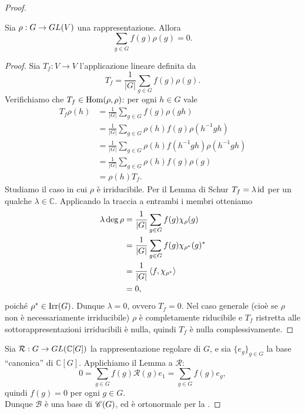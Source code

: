 \begin{proof}
\begin{lemma*}
Sia $\rho:G\to GL(V)$ una rappresentazione. Allora
$$
\sum_{g\in G}f(g)\rho(g)=0.
$$
\end{lemma*}
\begin{proof}
Sia $T_f:V\to V$ l'applicazione lineare definita da
$$
T_f=\frac{1}{|G|}\sum_{g\in G}f(g)\rho(g).
$$
Verifichiamo che $T_f\in\operatorname{Hom}(\rho,\rho)$: per ogni $h\in G$ vale
\begin{align*}
T_f\rho(h)&=\frac{1}{|G|}\sum_{g\in G}f(g)\rho(gh)\\
&=\frac{1}{|G|}\sum_{g\in G}\rho(h)f(g)\rho(h^{-1}gh)\\
&=\frac{1}{|G|}\sum_{g\in G}\rho(h)f(h^{-1}gh)\rho(h^{-1}gh)\\
&=\frac{1}{|G|}\sum_{g\in G}\rho(h)f(g)\rho(g)\\
&=\rho(h)T_f.
\end{align*}
Studiamo il caso in cui $\rho$ è irriducibile. Per il Lemma di Schur $T_f=\lambda\operatorname{id}$ per un qualche $\lambda\in\mathbb{C}$. Applicando la traccia a entrambi i membri otteniamo
\begin{align*}
\lambda\deg\rho&=\frac{1}{|G|}\sum_{g\in G}f(g)\chi_\rho(g)\\
&=\frac{1}{|G|}\sum_{g\in G}f(g)\chi_{\rho^*}(g)^*\\
&=\frac{1}{|G|}\left\langle f,\chi_{\rho^*}\right\rangle\\
&=0,
\end{align*}
poiché $\rho^*\in\operatorname{Irr}(G)$. Dunque $\lambda=0$, ovvero $T_f=0$. Nel caso generale (cioè se $\rho$ non è necessariamente irriducibile) $\rho$ è completamente riducibile e $T_f$ ristretta alle sottorappresentazioni irriducibili è nulla, quindi $T_f$ è nulla complessivamente.
\end{proof}
Sia $\mathcal{R}:G\to GL(\mathbb{C}[G])$ la rappresentazione regolare di $G$, e sia $\{e_g\}_{g\in G}$ la base ``canonica'' di $\mathbb{C}[G]$. Applichiamo il Lemma a $\mathcal{R}$: 
$$
0=\sum_{g\in G}f(g)\mathcal{R}(g)e_1=\sum_{g\in G}f(g)e_g,
$$
quindi $f(g)=0$ per ogni $g\in G$.\\
Dunque $\mathcal{B}$ è una base di $\mathscr{C}(G)$, ed è ortonormale per la .
\end{proof}





